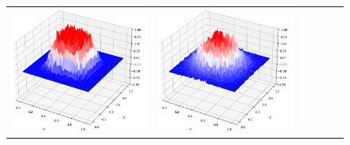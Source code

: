 \documentclass[12pt, reqno]{report}
\theoremstyle{definition}
\theoremstyle{remark}
\begin{document}
\begin{figure}[H]
\begin{tabular}{rccccc}
        \includegraphics[align = c, height=\subheight]{media_paper/surf_MD_n=200.png} &
        \includegraphics[align = c, height=\subheight]{media_paper/surf_MD_n=500.png} &

\end{tabular}
\end{figure}
\end{document}
